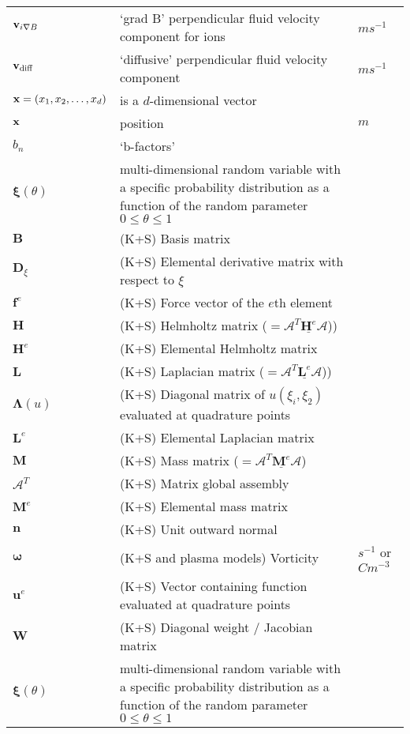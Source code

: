 \begin{longtable}{|p{3.0cm}|p{10.0cm}|p{3.0cm}|}
${\bf v}_{i \nabla B}$ & `grad B' perpendicular fluid velocity component for ions  &  $m s^{-1}$ \\
${\bf v}_\textrm{diff}$ & `diffusive' perpendicular fluid velocity component  &  $m s^{-1}$ \\
${\bf x}=\left(x_1,x_2,\dots,x_d\right)$ & is a $d$-dimensional vector  & \\
${\bf x}$ & position  &  $m$ \\
$b_n$ & `b-factors'~\cite[slide 21]{omullane} & \\
$\boldsymbol{\xi}(\theta)$ & multi-dimensional random variable with a specific probability distribution as a function of the random parameter~$0\leq\theta\leq 1$ & \\
$\boldsymbol{B}$ &  (K+S) Basis matrix & \\
$\boldsymbol{D}_{\xi}$ &  (K+S) Elemental derivative matrix with respect to $\xi$ & \\
$\boldsymbol{f}^e$ &  (K+S) Force vector of the $e$th element & \\
$\boldsymbol{H}$ &  (K+S) Helmholtz matrix ($=\mathcal{A}^T \underline{\boldsymbol{H}^e} \mathcal{A}$)) & \\
$\boldsymbol{H}^e$ &  (K+S) Elemental Helmholtz matrix & \\
$\boldsymbol{L}$ &  (K+S) Laplacian matrix ($=\mathcal{A}^T \underline{\boldsymbol{L}^e} \mathcal{A}$)) & \\
$\boldsymbol{\Lambda}(u)$ &  (K+S) Diagonal matrix of $u(\xi_i, \xi_2)$ evaluated at quadrature points & \\
$\boldsymbol{L}^e$ &  (K+S) Elemental Laplacian matrix & \\
$\boldsymbol{M}$ &  (K+S) Mass matrix ($=\mathcal{A}^T \underline{\boldsymbol{M}^e} \mathcal{A}$) & \\
$\boldsymbol{\mathcal{A}}^T$ &  (K+S) Matrix global assembly & \\
$\boldsymbol{M}^e$ &  (K+S) Elemental mass matrix & \\
$\boldsymbol{n}$ &  (K+S) Unit outward normal & \\
$\boldsymbol{\omega}$ &  (K+S and plasma models) Vorticity & $s^{-1}$ or $C m^{-3}$\\
$\boldsymbol{u}^e$ &  (K+S) Vector containing function evaluated at quadrature points & \\
$\boldsymbol{W}$ &  (K+S) Diagonal weight / Jacobian matrix & \\
$\boldsymbol{\xi}(\theta)$ & multi-dimensional random variable with a specific probability distribution as a function of the random parameter~$0\leq\theta\leq 1$ & \\

\end{longtable}
